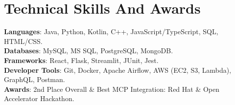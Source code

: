 \documentclass[letterpaper,11pt]{article}
\begin{document}
\section{Technical Skills And Awards}
 \begin{itemize}[leftmargin=0.15in, label={}]
    \small{\item{
     \textbf{Languages}{: Java, Python, Kotlin, C++, JavaScript/TypeScript, SQL, HTML/CSS.} \\
     \textbf{Databases}{: MySQL, MS SQL, PostgreSQL, MongoDB.} \\
     \textbf{Frameworks}{: React, Flask, Streamlit, JUnit, Jest.} \\
    \textbf{Developer Tools}{: Git, Docker, Apache Airflow, AWS (EC2, S3, Lambda), GraphQL, Postman.} \\
    \textbf{Awards}{: 2nd Place Overall \& Best MCP Integration: Red Hat \& Open Accelerator Hackathon.}
    }}
 \end{itemize}
\end{document}
